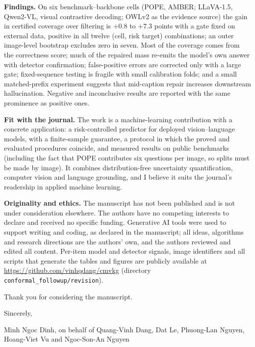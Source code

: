 \documentclass[10.5pt,a4paper]{article}
\begin{document}
\textbf{Findings.} On six benchmark--backbone cells (POPE, AMBER; LLaVA-1.5, Qwen2-VL, visual contrastive decoding; OWLv2 as the evidence source) the gain in certified coverage over filtering is $+0.8$ to $+7.3$ points with a gate fixed on external data,
positive in all twelve (cell, risk target) combinations; an outer image-level bootstrap excludes zero in seven. Most of the coverage comes from the correctness score; much of the repaired mass re-emits the model's own answer with detector confirmation;
false-positive errors are corrected only with a large gate; fixed-sequence testing is fragile with small calibration folds; and a small matched-prefix experiment suggests that mid-caption repair increases downstream hallucination.
Negative and inconclusive results are reported with the same prominence as positive ones.

\textbf{Fit with the journal.} The work is a machine-learning contribution with a concrete application: a risk-controlled predictor for deployed vision--language models, with a finite-sample guarantee, a protocol in which the proved and evaluated procedures coincide, and measured results on public benchmarks (including the fact that POPE contributes six questions per image, so splits must be made by image). It combines distribution-free uncertainty quantification, computer vision and language grounding, and I believe it suits the journal's readership in applied machine learning.

\textbf{Originality and ethics.} The manuscript has not been published and is not under consideration elsewhere. The authors have no competing interests to declare and received no specific funding. Generative AI tools were used to support writing and coding, as declared in the manuscript;
all ideas, algorithms and research directions are the authors' own, and the authors reviewed and edited all content. Per-item model and detector signals, image identifiers and all scripts that generate the tables and figures are publicly available at
\url{https://github.com/vinhqdang/cmvkg} (directory \texttt{conformal\_followup/revision}).

Thank you for considering the manuscript.

Sincerely,

Minh Ngoc Dinh, on behalf of Quang-Vinh Dang, Dat Le, Phuong-Lan Nguyen, Hoang-Viet Vu and Ngoc-Son-An Nguyen
\end{document}
